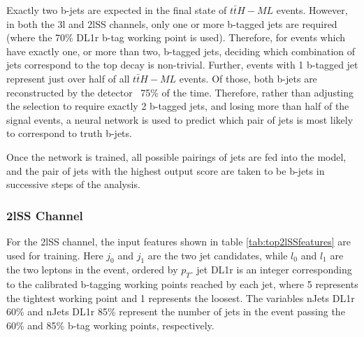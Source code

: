 Exactly two b-jets are expected in the final state of $t\bar{t}H-ML$ events. However, in both the 3l and 2lSS channels, only one or more b-tagged jets are required (where the 70\% DL1r b-tag working point is used). Therefore, for events which have exactly one, or more than two, b-tagged jets, deciding which combination of jets correspond to the top decay is non-trivial. Further, events with 1 b-tagged jet represent just over half of all $t\bar{t}H-ML$ events. Of those, both b-jets are reconstructed by the detector ~75\% of the time. Therefore, rather than adjusting the selection to require exactly 2 b-tagged jets, and losing more than half of the signal events, a neural network is used to predict which pair of jets is most likely to correspond to truth b-jets.

Once the network is trained, all possible pairings of jets are fed into the model, and the pair of jets with the highest output score are taken to be b-jets in successive steps of the analysis. 

\subsubsection{2lSS Channel}
\label{subsec:top2lSS}

For the 2lSS channel, the input features shown in table \ref{tab:top2lSSfeatures} are used for training. Here $j_0$ and $j_1$ are the two jet candidates, while $l_0$ and $l_1$ are the two leptons in the event, ordered by $p_T$. jet DL1r is an integer corresponding to the calibrated b-tagging working points reached by each jet, where 5 represents the tightest working point and 1 represents the loosest. The variables nJets DL1r 60\% and nJets DL1r 85\% represent the number of jets in the event passing the 60\% and 85\% b-tag working points, respectively.

